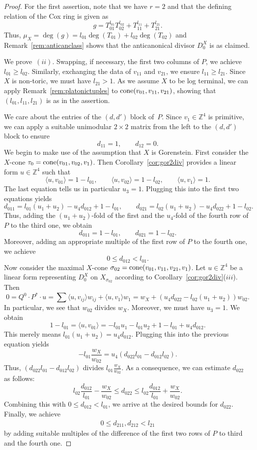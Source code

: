 \documentclass[pdftex]{sigma}%
\theoremstyle{definition}
\def\ZZ{{\mathbb Z}}
\def\bangle#1{{\langle #1 \rangle}}
\def\cone{{\rm cone}}
\numberwithin{equation}{section}
\begin{document}
\begin{proof}
For the first assertion, note that we have
$r = 2$ and that the defining relation of
the Cox ring is given as
\[
g = T_{01}^{l_{01}}T_{02}^{l_{02}} + T_{11}^{l_{11}} + T_{21}^{l_{21}} .
\]
Thus, $\mu_X = \deg(g) = l_{01}\deg(T_{01}) + l_{02}\deg(T_{02})$
and Remark~\ref{rem:anticanclass} shows that
the anticanonical divisor $D^X_0$ is as claimed.

We prove~$(ii)$.
Swapping, if necessary, the first two
columns of $P$, we achieve
$l_{01} \ge l_{02}$.
Similarly, exchanging the data of
$v_{11}$ and $v_{21}$, we ensure
$l_{11} \ge l_{21}$.
Since~$X$ is non-toric, we must have
$l_{21} > 1$.
As we assume $X$ to be log terminal, we
can apply Remark~\ref{rem:platonictuples}
to $\cone(v_{01},v_{11},v_{21})$, showing that
$(l_{01},l_{11},l_{21})$ is as in the assertion.

We care about the entries of the $(d,d')$ block of~$P$.
Since $v_1 \in \ZZ^4$ is primitive, we can
apply a suitable unimodular $2 \times 2$ matrix from
the left to the $(d,d')$ block to ensure
\[
d_{11} = 1,\qquad
d_{12} = 0.
\]
We begin to make use of the assumption that
$X$ is Gorenstein.
First consider the $X$-cone $\tau_0 = \cone(v_{01},v_{02},v_1)$.
Then Corollary~\ref{cor:gor2div} provides a linear form
$u \in \ZZ^4$ such that
\[
\bangle{u,v_{01}} = 1-l_{01},\qquad
\bangle{u,v_{02}} = 1-l_{02},\qquad
\bangle{u,v_{1}} = 1.
\]
The last equation tells us in particular $u_3 = 1$.
Plugging this into the first two equations yields
\[
d_{011} = l_{01}(u_1+u_2) - u_4 d_{012} + 1-l_{01},\qquad
d_{021} = l_{02}(u_1+u_2) - u_4 d_{022} + 1-l_{02}.
\]
Thus, adding the $(u_1+u_2)$-fold of the first
and the $u_4$-fold of the fourth row of $P$
to the third one, we obtain
\[
d_{011} = 1-l_{01},\qquad
d_{021} = 1-l_{02}.
\]
Moreover, adding an appropriate multiple of the first row
of $P$ to the fourth one, we achieve
\[
0 \le d_{012} < l_{01}.
\]
Now consider the maximal $X$-cone
$\sigma_{02} = \cone(v_{01},v_{11},v_{21},v_1)$.
Let $u \in \ZZ^4$ be a linear form
representing $D_0^X$ on $X_{\sigma_{02}}$ according to
Corollary~\ref{cor:gor2div}($iii$).
Then
\[
0=Q^0 \cdot P^* \cdot u =
\sum \bangle{u,v_{ij}}w_{ij} + \bangle{u,v_1}w_1
 =w_X + (u_4 d_{022} - l_{02}(u_1 + u_2)) w_{02}.
\]
In particular, we see that $w_{02}$ divides $w_X$.
Moreover, we must have $u_3=1$. We obtain
\[
1-l_{01} =\bangle{u,v_{01}} =
-l_{01}u_1 - l_{01}u_2 + 1-l_{01} + u_4d_{012}.
\]
This merely means $l_{01}(u_1 + u_2)=u_4d_{012}$.
Plugging this into the previous equation yields
\[
- l_{01} \frac{w_X}{w_{02}} =
u_4 (d_{022}l_{01}-d_{012}l_{02}).
\]
Thus, $(d_{022}l_{01}-d_{012}l_{02})$ divides $l_{01}\frac{w_X}{w_{02}}$.
As a consequence, we can estimate $d_{022}$ as follows:
\[
l_{02}\frac{d_{012}}{l_{01}} - \frac{w_X}{w_{02}}
 \le
d_{022}
 \le
l_{02}\frac{d_{012}}{l_{01}} + \frac{w_X}{w_{02}}.
\]
Combining this with $0 \leq d_{012} < l_{01}$, we arrive
at the desired bounds for $d_{022}$.
Finally, we achieve
\begin{gather*}
0 \le d_{211}, d_{212} < l_{21}
\end{gather*}
by adding suitable multiples of the difference of the first
two rows of $P$ to third and the fourth one.
\end{proof}
\end{document}
